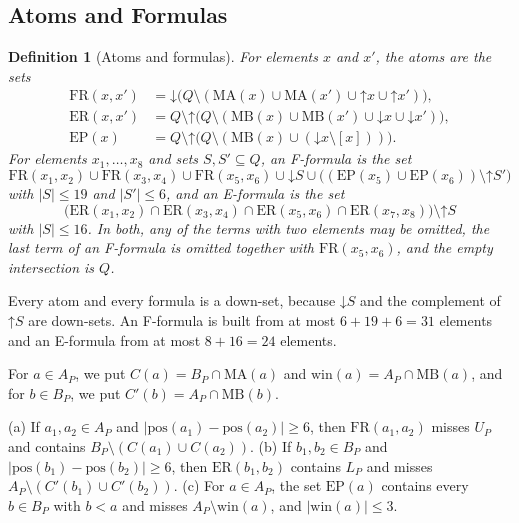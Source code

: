 \documentclass[pdflatex,sn-mathphys-num]{sn-jnl}%
\theoremstyle{thmstyleone}%
\theoremstyle{thmstyletwo}%
\theoremstyle{thmstylethree}%
\newtheorem{definition}{Definition}%
\newcommand{\dn}{\mathord{\downarrow}}%
\newcommand{\upp}{\mathord{\uparrow}}%
\newcommand{\pos}{\mathrm{pos}}%
\newcommand{\MB}{\mathrm{MB}}%
\newcommand{\MA}{\mathrm{MA}}%
\newcommand{\win}{\mathrm{win}}%
\newcommand{\FR}{\mathrm{FR}}%
\newcommand{\ER}{\mathrm{ER}}%
\newcommand{\EP}{\mathrm{EP}}%
\begin{document}
\subsection{Atoms and Formulas}
\label{sec:pa-atoms}

\begin{definition}[Atoms and formulas]
\label{def:pa-atoms}
For elements $x$ and $x'$, the \emph{atoms} are the sets
\begin{align*}
\FR(x, x') &= \dn \bigl(Q \setminus (\MA(x) \cup \MA(x') \cup \upp x \cup \upp x')\bigr),\\
\ER(x, x') &= Q \setminus \upp \bigl(Q \setminus (\MB(x) \cup \MB(x') \cup \dn x \cup \dn x')\bigr),\\
\EP(x) &= Q \setminus \upp \bigl(Q \setminus (\MB(x) \cup (\dn x \setminus [x]))\bigr).
\end{align*}
For elements $x_1, \dots, x_8$ and sets $S, S' \subseteq Q$, an \emph{F-formula} is the set
\[
\FR(x_1, x_2) \cup \FR(x_3, x_4) \cup \FR(x_5, x_6) \cup \dn S \cup \bigl((\EP(x_5) \cup \EP(x_6)) \setminus \upp S'\bigr)
\]
with $|S| \leq 19$ and $|S'| \leq 6$, and an \emph{E-formula} is the set
\[
\bigl(\ER(x_1, x_2) \cap \ER(x_3, x_4) \cap \ER(x_5, x_6) \cap \ER(x_7, x_8)\bigr) \setminus \upp S
\]
with $|S| \leq 16$.
In both, any of the terms with two elements may be omitted, the last term of an F-formula is omitted together with $\FR(x_5, x_6)$, and the empty intersection is $Q$.
\end{definition}

Every atom and every formula is a down-set, because $\dn S$ and the complement of $\upp S$ are down-sets.
An F-formula is built from at most $6 + 19 + 6 = 31$ elements and an E-formula from at most $8 + 16 = 24$ elements.

For $a \in A_P$, we put $C(a) = B_P \cap \MA(a)$ and $\win(a) = A_P \cap \MB(a)$, and for $b \in B_P$, we put $C'(b) = A_P \cap \MB(b)$.

\begin{lemma}[Atoms]
\label{lem:pa-atoms}
(a) If $a_1, a_2 \in A_P$ and $|\pos(a_1) - \pos(a_2)| \geq 6$, then $\FR(a_1, a_2)$ misses $U_P$ and contains $B_P \setminus (C(a_1) \cup C(a_2))$.
(b) If $b_1, b_2 \in B_P$ and $|\pos(b_1) - \pos(b_2)| \geq 6$, then $\ER(b_1, b_2)$ contains $L_P$ and misses $A_P \setminus (C'(b_1) \cup C'(b_2))$.
(c) For $a \in A_P$, the set $\EP(a)$ contains every $b \in B_P$ with $b < a$ and misses $A_P \setminus \win(a)$, and $|\win(a)| \leq 3$.
\end{lemma}
\end{document}

